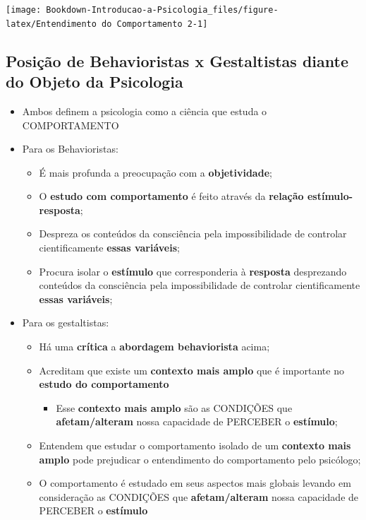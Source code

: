 \documentclass[
]{book}
\providecommand{\tightlist}{%
  \setlength{\itemsep}{0pt}\setlength{\parskip}{0pt}}
\begin{document}
\texttt{[image: Bookdown-Introducao-a-Psicologia\_files/figure-latex/Entendimento do Comportamento 2-1]}

\hypertarget{posiuxe7uxe3o-de-behavioristas-x-gestaltistas-diante-do-objeto-da-psicologia-1}{%
\subsection{Posição de Behavioristas x Gestaltistas diante do Objeto da Psicologia}\label{posiuxe7uxe3o-de-behavioristas-x-gestaltistas-diante-do-objeto-da-psicologia-1}}

\begin{itemize}
\tightlist
\item
  Ambos definem a psicologia como a ciência que estuda o COMPORTAMENTO
\item
  Para os Behavioristas:

  \begin{itemize}
  \tightlist
  \item
    É mais profunda a preocupação com a \textbf{objetividade};
  \item
    O \textbf{estudo com comportamento} é feito através da \textbf{relação estímulo-resposta};
  \item
    Despreza os conteúdos da consciência pela impossibilidade de controlar cientificamente \textbf{essas variáveis};
  \item
    Procura isolar o \textbf{estímulo} que corresponderia à \textbf{resposta} desprezando conteúdos da consciência pela impossibilidade de controlar cientificamente \textbf{essas variáveis};
  \end{itemize}
\item
  Para os gestaltistas:

  \begin{itemize}
  \tightlist
  \item
    Há uma \textbf{crítica} a \textbf{abordagem behaviorista} acima;
  \item
    Acreditam que existe um \textbf{contexto mais amplo} que é importante no \textbf{estudo do comportamento}

    \begin{itemize}
    \tightlist
    \item
      Esse \textbf{contexto mais amplo} são as CONDIÇÕES que \textbf{afetam/alteram} nossa capacidade de PERCEBER o \textbf{estímulo};
    \end{itemize}
  \item
    Entendem que estudar o comportamento isolado de um \textbf{contexto mais amplo} pode prejudicar o entendimento do comportamento pelo psicólogo;
  \item
    O comportamento é estudado em seus aspectos mais globais levando em consideração as CONDIÇÕES que \textbf{afetam/alteram} nossa capacidade de PERCEBER o \textbf{estímulo}
  \end{itemize}
\end{itemize}
\end{document}
